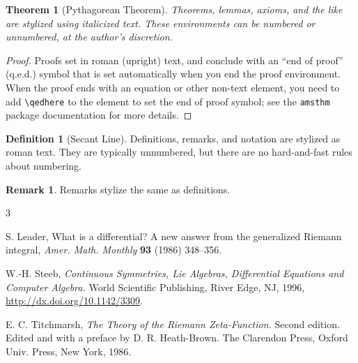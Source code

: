 \documentclass{article}
\theoremstyle{theorem}
\newtheorem{theorem}{Theorem}
\theoremstyle{definition}
\newtheorem*{definition}{Definition}
\newtheorem*{remark}{Remark}
\begin{document}
\begin{theorem}[Pythagorean Theorem]
Theorems, lemmas, axioms, and the like are stylized using italicized text. These environments can be numbered or unnumbered, at the author's discretion.
\end{theorem}

\begin{proof}
Proofs set in roman (upright) text, and conclude with an ``end of proof'' (q.e.d.) symbol that is set automatically when you end the proof environment.  When the proof ends with an equation or other non-text element, you need to add \verb~\qedhere~ to the element to set the end of proof symbol; see the \texttt{amsthm} package documentation for more details.
\end{proof}

\begin{definition}[Secant Line]
Definitions, remarks, and notation are stylized as roman text.  They are typically unnumbered, but there are no hard-and-fast rules about numbering.
\end{definition}

\begin{remark}
Remarks stylize the same as definitions.
\end{remark}

\begin{thebibliography}{3}

 S. Leader, What is a differential? A new answer from the generalized Riemann integral, {\it Amer. Math. Monthly\/} {\bf 93} (1986) 348--356.

 W.-H. Steeb, \textit{Continuous Symmetries, Lie Algebras, Differential Equations and Computer Algebra.\/} World Scientific Publishing, River Edge, NJ, 1996, \href{http://dx.doi.org/10.1142/3309}{\url{http://dx.doi.org/10.1142/3309}}.

 E. C. Titchmarsh, {\it The Theory of the Riemann Zeta-Function.\/} Second edition. Edited and with a preface by D. R. Heath-Brown. The Clarendon Press, Oxford Univ. Press, New York, 1986.
\end{thebibliography}
\end{document}
